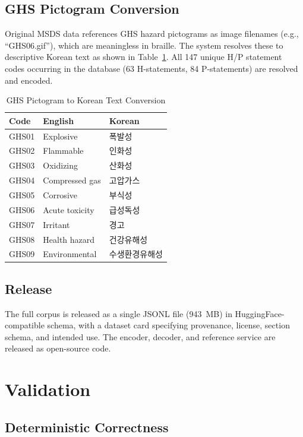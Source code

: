 \documentclass[journal]{IEEEtran}
\begin{document}
\subsection{GHS Pictogram Conversion}

Original MSDS data references GHS hazard pictograms as image filenames (e.g., ``GHS06.gif''), which are meaningless in braille. The system resolves these to descriptive Korean text as shown in Table~\ref{tab:ghs}. All 147 unique H/P statement codes occurring in the database (63 H-statements, 84 P-statements) are resolved and encoded.

\begin{table}[h]
\centering
\caption{GHS Pictogram to Korean Text Conversion}
\label{tab:ghs}
\begin{tabular}{lll}
\toprule
Code & English & Korean \\
\midrule
GHS01 & Explosive & {폭발성} \\
GHS02 & Flammable & {인화성} \\
GHS03 & Oxidizing & {산화성} \\
GHS04 & Compressed gas & {고압가스} \\
GHS05 & Corrosive & {부식성} \\
GHS06 & Acute toxicity & {급성독성} \\
GHS07 & Irritant & {경고} \\
GHS08 & Health hazard & {건강유해성} \\
GHS09 & Environmental & {수생환경유해성} \\
\bottomrule
\end{tabular}
\end{table}

\subsection{Release}

The full corpus is released as a single JSONL file (943~MB) in HuggingFace-compatible schema, with a dataset card specifying provenance, license, section schema, and intended use. The encoder, decoder, and reference service are released as open-source code.

\section{Validation}
\label{sec:validation}

\subsection{Deterministic Correctness}
\end{document}
